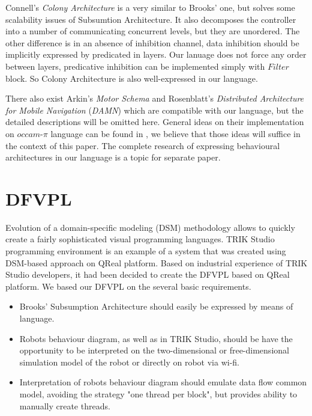 \documentclass[conference,compsoc]{IEEEtran}
\begin{document}
Connell's \textit{Colony Architecture}\cite{connell1989colony} is a very similar to Brooks' one, but solves some scalability issues of Subsumtion Architecture. It also decomposes the controller into a number of communicating concurrent levels, but they are unordered. The other difference is in an absence of inhibition channel, data inhibition should be implicitly expressed by predicated in layers. Our lanuage does not force any order between layers, predicative inhibition can be implemented simply with $Filter$ block. So Colony Architecture is also well-expressed in our language.

There also exist Arkin’s \textit{Motor Schema}\cite{arkin1987motor} and Rosenblatt’s \textit{Distributed Architecture for Mobile Navigation} (\textit{DAMN})\cite{rosenblatt1997damn} which are compatible with our language, but the detailed descriptions will be omitted here. General ideas on their implementation on $occam\mbox{-}\pi$ language can be found in \cite{simpson2009toward}, we believe that those ideas will suffice in the context of this paper. The complete research of expressing behavioural architectures in our language is a topic for separate paper.

\section{DFVPL}
\label{sec:lang}
Evolution of a domain-specific modeling (DSM) methodology allows to quickly create a fairly sophisticated visual programming languages\cite{koznov2008}. TRIK Studio programming environment is an example of a system that was created using DSM-based approach on QReal platform\cite{qrealMeta, kuzenkova2013qreal}. Based on industrial experience of TRIK Studio developers, it had been decided to create the DFVPL based on QReal platform. We based our DFVPL on the several basic requirements.

\begin{itemize}
\item Brooks’ Subsumption Architecture should easily be expressed by means of language.
\item Robots behaviour diagram, as well as in TRIK Studio, should be have the opportunity to be interpreted on the two-dimensional or free-dimensional simulation model of the robot or directly on robot via wi-fi.
\item Interpretation  of robots behaviour diagram  should emulate data flow common model, avoiding the strategy "one thread per block", but provides ability to manually create threads.
\end{itemize}
\end{document}

